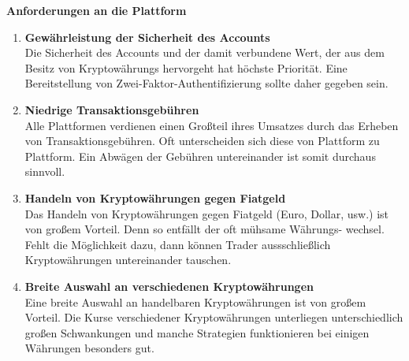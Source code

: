 \documentclass[oneside]{ausarbeitung}
\begin{document}
\textbf{Anforderungen an die Plattform}
\begin{enumerate}
	\item \textbf{Gewährleistung der Sicherheit des Accounts} \\
		Die Sicherheit des Accounts und der damit 
		verbundene Wert, der aus dem Besitz von Kryptowährungs hervorgeht hat
		höchste Priorität. Eine Bereitstellung von Zwei-Faktor-Authentifizierung
		sollte daher gegeben sein.
	\item \textbf{Niedrige Transaktionsgebühren} \\
		Alle Plattformen verdienen einen Großteil ihres Umsatzes durch das
		Erheben von Transaktionsgebühren. Oft unterscheiden sich diese von
		Plattform zu Plattform. Ein Abwägen der Gebühren untereinander ist
		somit durchaus sinnvoll.
	\item \textbf{Handeln von Kryptowährungen gegen Fiatgeld} \\
		Das Handeln von Kryptowährungen gegen Fiatgeld (Euro, Dollar, usw.)
		ist von großem Vorteil. Denn so entfällt der oft mühsame Währungs-
		wechsel. Fehlt die Möglichkeit dazu, dann können Trader aussschließlich
		Kryptowährungen untereinander tauschen.
	\item \textbf{Breite Auswahl an verschiedenen Kryptowährungen} \\
		Eine breite Auswahl an handelbaren Kryptowährungen ist von großem
		Vorteil. Die Kurse verschiedener Kryptowährungen unterliegen
		unterschiedlich großen Schwankungen und manche Strategien funktionieren
		bei einigen Währungen besonders gut. \\
\end{enumerate}
\end{document}
